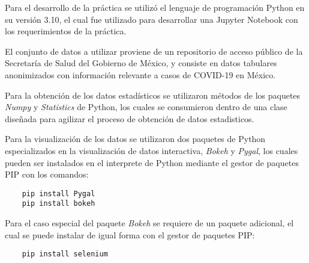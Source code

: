 Para el desarrollo de la práctica se utilizó el lenguaje de programación Python en su versión 3.10, el cual fue utilizado para desarrollar una Jupyter Notebook con los requerimientos de la práctica.

El conjunto de datos a utilizar proviene de un repositorio de acceso público de la Secretaría de Salud del Gobierno de México, y consiste en datos tabulares anonimizados con información relevante a casos de COVID-19 en México.

Para la obtención de los datos estadísticos se utilizaron métodos de los paquetes \emph{Numpy} y \emph{Statistics} de Python, los cuales se consumieron dentro de una clase diseñada para agilizar el proceso de obtención de datos estadisticos.

Para la visualización de los datos se utilizaron dos paquetes de Python especializados en la visualización de datos interactiva, \emph{Bokeh} y \emph{Pygal}, los cuales pueden ser instalados en el interprete de Python mediante el gestor de paquetes PIP con los comandos:

\begin{lstlisting}
	pip install Pygal
	pip install bokeh
\end{lstlisting}

Para el caso especial del paquete \emph{Bokeh} se requiere de un paquete adicional, el cual se puede instalar de igual forma con el gestor de paquetes PIP:

\begin{lstlisting}
	pip install selenium
\end{lstlisting}

